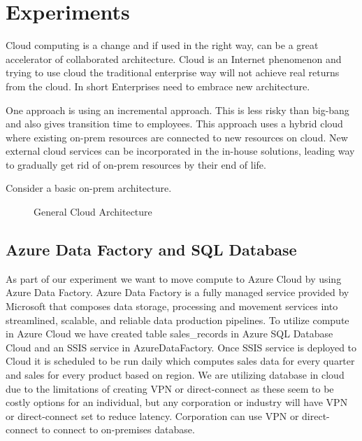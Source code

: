 \chapter{Experiments}\label{chap:experiments}

Cloud computing is a change and if used in the right way, can be a great accelerator of collaborated architecture. Cloud is an Internet phenomenon and trying to use cloud the traditional enterprise way will not achieve real returns from the cloud. In short Enterprises need to embrace new architecture. 

One approach is using an incremental approach. This is less risky than big-bang and also gives transition time to employees. This approach uses a hybrid cloud where existing on-prem resources are connected to new resources on cloud. New external cloud services can be incorporated in the in-house solutions, leading way to gradually get rid of on-prem resources by their end of life. 

Consider a basic on-prem architecture.

\begin{figure}[!htb]
    \caption{\label{fig:GCA} General Cloud Architecture}
\end{figure}

\section{Azure Data Factory and SQL Database}
As part of our experiment we want to move compute to Azure Cloud by using Azure Data Factory. Azure Data Factory is a fully managed service provided by Microsoft that composes data storage, processing and movement services into streamlined, scalable, and reliable data production pipelines. To utilize compute in Azure Cloud we have created table sales\_records in Azure SQL Database Cloud and an SSIS service in AzureDataFactory. Once SSIS service is deployed to Cloud it is scheduled to be run daily which computes sales data for every quarter and sales for every product based on region. We are utilizing database in cloud due to the limitations of creating VPN or direct-connect as these seem to be costly options for an individual, but any corporation or industry will have VPN or direct-connect set to reduce latency. Corporation can use VPN or direct-connect to connect to on-premises database.

